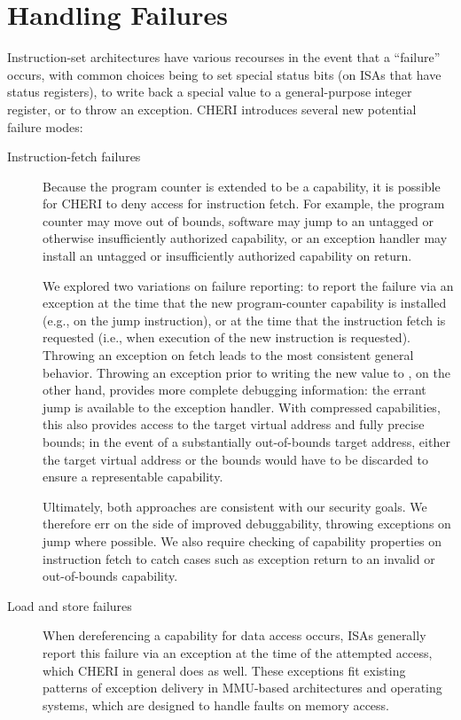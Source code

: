

\section{Handling Failures}

Instruction-set architectures have various recourses in the event that a
``failure'' occurs, with common choices being to set special status bits (on
ISAs that have status registers), to write back a special value to a
general-purpose integer register, or to throw an exception.
CHERI introduces several new potential failure modes:

\begin{description}
\item[Instruction-fetch failures] Because the program counter is extended to
  be a capability, it is possible for CHERI to deny access for instruction
  fetch.
  For example, the program counter may move out of bounds, software may
  jump to an untagged or otherwise insufficiently authorized capability, or an
  exception handler may install an untagged or insufficiently authorized
  capability on return.

  We explored two variations on failure reporting: to report the
  failure via an exception at the time that the new program-counter capability
  is installed (e.g., on the jump instruction), or at the time that the
  instruction fetch is requested (i.e., when execution of the new instruction
  is requested).
  Throwing an exception on fetch leads to the most consistent general
  behavior.
  Throwing an exception prior to writing the new value to \PCC{}, on the other
  hand, provides more complete debugging information: the errant jump \PCC{} is
  available to the exception handler.
  With compressed capabilities, this also provides access to the target virtual
  address and fully precise bounds; in the event of a substantially
  out-of-bounds target address, either the target virtual address or the
  bounds would have to be discarded to ensure a representable capability.

  Ultimately, both approaches are consistent with our security goals.
  We therefore err on the side of improved debuggability, throwing exceptions
  on jump where possible.
  We also require checking of capability properties on instruction fetch to
  catch cases such as exception return to an invalid or out-of-bounds
  capability.

\item[Load and store failures] When dereferencing a capability for data
  access occurs, ISAs generally report this failure via an exception at the
  time of the attempted access, which CHERI in general does as well.
  These exceptions fit existing patterns of exception delivery in MMU-based
  architectures and operating systems, which are designed to handle faults on
  memory access.


\end{description}
